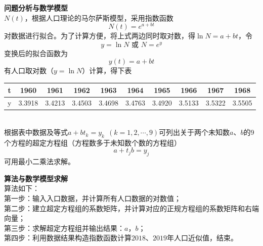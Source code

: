 \documentclass[10pt,a4paper]{article}
\begin{document}
\noindent\textbf{问题分析与数学模型}\\
$N(t)$，根据人口理论的马尔萨斯模型，采用指数函数
\begin{equation}
\label{Malthus}
N(t)=e^{a+bt}
\end{equation}
对数据进行拟合。为了计算方便，将上式两边同时取对数，得$\ln N=a+bt$，令
\[
y=\ln N\text{ 或 }N=e^y
\]
变换后的拟合函数为
\[
y(t)=a+bt
\]
有人口取对数（$y=\ln N$）计算，得下表
\begin{table}[h]
\footnotesize
\begin{tabular}{|c|c|c|c|c|c|c|c|c|c|}
\hline
t & 1960   & 1961   & 1962   & 1963   & 1964   & 1965   & 1966   & 1967   & 1968   \\ \hline
y & 3.3918 & 3.4213 & 3.4503 & 3.4698 & 3.4763 & 3.4920 & 3.5133 & 3.5322 & 3.5505 \\ \hline
\end{tabular}
\end{table}
\\根据表中数据及等式$a+bt_k=y_k~~(k=1,2,\cdots,9)$可列出关于两个未知数$a$、$b$的9个方程的超定方程组（方程数多于未知数个数的方程组）
\[
a+t_jb=y_j
\]
可用最小二乘法求解。

\noindent\textbf{算法与数学模型求解}\\
算法如下：\\
第一步：输入入口数据，并计算所有人口数据的对数值；\\
第二步：建立超定方程组的系数矩阵，并计算对应的正规方程组的系数矩阵和右端向量；\\
第三步：求解超定方程组并输出结果：$a$，$b$；\\
第四步：利用数据结果构造指数函数计算$2018$、$2019$年人口近似值，结束。
\end{document}
